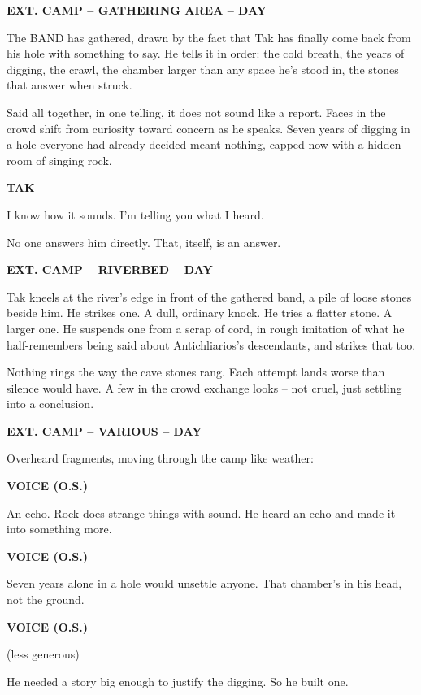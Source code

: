 \documentclass[12pt]{article}
\newcommand{\sceneheading}[1]{%
  \bigskip\noindent\textbf{#1}\par\smallskip
}
\newcommand{\action}[1]{%
  \noindent #1\par\medskip
}
\newcommand{\charcue}[1]{%
  \par\hspace*{2.2in}\textbf{#1}\par
}
\newenvironment{dialogue}{%
  \begin{list}{}{\leftmargin=1.5in\rightmargin=2in\itemsep=0pt\parsep=0pt\topsep=0pt}
  \item[]
}{%
  \end{list}\medskip
}
\newcommand{\parenthetical}[1]{%
  \hspace*{1.9in}(#1)\par
}
\begin{document}
\sceneheading{EXT. CAMP -- GATHERING AREA -- DAY}

\action{The BAND has gathered, drawn by the fact that Tak has finally come back from his hole with something to say. He tells it in order: the cold breath, the years of digging, the crawl, the chamber larger than any space he's stood in, the stones that answer when struck.}

\action{Said all together, in one telling, it does not sound like a report. Faces in the crowd shift from curiosity toward concern as he speaks. Seven years of digging in a hole everyone had already decided meant nothing, capped now with a hidden room of singing rock.}

\charcue{TAK}
\begin{dialogue}
I know how it sounds. I'm telling you what I heard.
\end{dialogue}

\action{No one answers him directly. That, itself, is an answer.}

\sceneheading{EXT. CAMP -- RIVERBED -- DAY}

\action{Tak kneels at the river's edge in front of the gathered band, a pile of loose stones beside him. He strikes one. A dull, ordinary knock. He tries a flatter stone. A larger one. He suspends one from a scrap of cord, in rough imitation of what he half-remembers being said about Antichliarios's descendants, and strikes that too.}

\action{Nothing rings the way the cave stones rang. Each attempt lands worse than silence would have. A few in the crowd exchange looks -- not cruel, just settling into a conclusion.}

\sceneheading{EXT. CAMP -- VARIOUS -- DAY}

\action{Overheard fragments, moving through the camp like weather:}

\charcue{VOICE (O.S.)}
\begin{dialogue}
An echo. Rock does strange things with sound. He heard an echo and made it into something more.
\end{dialogue}

\charcue{VOICE (O.S.)}
\begin{dialogue}
Seven years alone in a hole would unsettle anyone. That chamber's in his head, not the ground.
\end{dialogue}

\charcue{VOICE (O.S.)}
\begin{dialogue}
\parenthetical{less generous}
He needed a story big enough to justify the digging. So he built one.
\end{dialogue}
\end{document}
